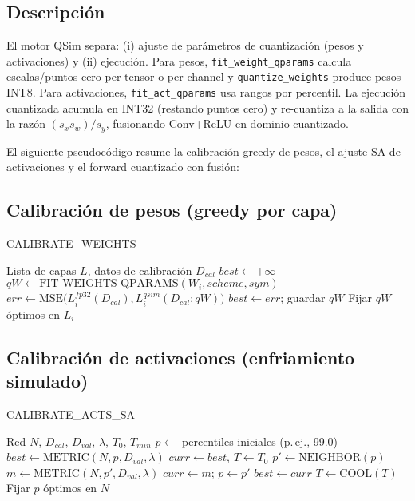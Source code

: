 \subsection*{Descripción}
El motor QSim separa: (i) ajuste de parámetros de cuantización (pesos y activaciones) y (ii) ejecución. Para pesos, \texttt{fit\_weight\_qparams} calcula escalas/puntos cero per-tensor o per-channel y \texttt{quantize\_weights} produce pesos INT8. Para activaciones, \texttt{fit\_act\_qparams} usa rangos por percentil. La ejecución cuantizada acumula en INT32 (restando puntos cero) y re-cuantiza a la salida con la razón $(s_x s_w)/s_y$, fusionando Conv+ReLU en dominio cuantizado.

El siguiente pseudocódigo resume la calibración greedy de pesos, el ajuste SA de activaciones y el forward cuantizado con fusión:

\subsection*{Calibración de pesos (greedy por capa)}
\begin{algorithm}[H]
\caption{CALIBRATE\_WEIGHTS}
\begin{algorithmic}[1]
\Require Lista de capas $L$, datos de calibración $D_{cal}$
    \State $best \gets +\infty$
            \State $qW \gets \text{FIT\_WEIGHTS\_QPARAMS}(W_i, scheme, sym)$
            \State $err \gets \text{MSE}\big(L_i^{fp32}(D_{cal}), L_i^{qsim}(D_{cal}; qW)\big)$
             \State $best \gets err$; guardar $qW$ \EndIf
        \EndFor
    \EndFor
    \State Fijar $qW$ óptimos en $L_i$
\EndFor
\end{algorithmic}
\end{algorithm}

\subsection*{Calibración de activaciones (enfriamiento simulado)}
\begin{algorithm}[H]
\caption{CALIBRATE\_ACTS\_SA}
\begin{algorithmic}[1]
\Require Red $N$, $D_{cal}$, $D_{val}$, $\lambda$, $T_0$, $T_{min}$
\State $p \gets$ percentiles iniciales (p.\,ej., 99.0)
\State $best \gets \text{METRIC}(N,p,D_{val},\lambda)$
\State $curr \gets best$, $T \gets T_0$
    \State $p' \gets \text{NEIGHBOR}(p)$ 
    \State $m \gets \text{METRIC}(N,p',D_{val},\lambda)$
     $curr \gets m$; $p \gets p'$ \EndIf
     $best \gets curr$ \EndIf
    \State $T \gets \text{COOL}(T)$
\EndWhile
\State Fijar $p$ óptimos en $N$
\end{algorithmic}
\end{algorithm}

